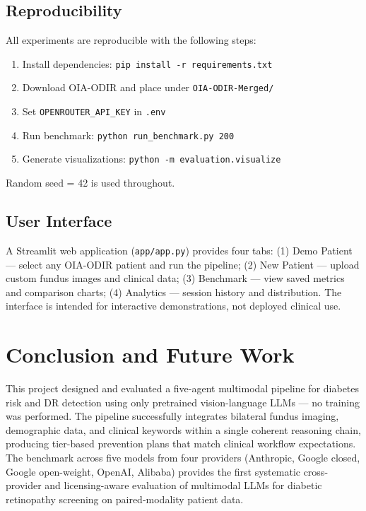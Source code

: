 \documentclass[11pt,a4paper]{article}
\begin{document}
\subsection{Reproducibility}

All experiments are reproducible with the following steps:

\begin{enumerate}
    \item Install dependencies: \texttt{pip install -r requirements.txt}
    \item Download OIA-ODIR and place under \texttt{OIA-ODIR-Merged/}
    \item Set \texttt{OPENROUTER\_API\_KEY} in \texttt{.env}
    \item Run benchmark: \texttt{python run\_benchmark.py 200}
    \item Generate visualizations: \texttt{python -m evaluation.visualize}
\end{enumerate}

Random seed = 42 is used throughout.

\subsection{User Interface}

A Streamlit web application (\texttt{app/app.py}) provides four tabs: (1) Demo Patient --- select any OIA-ODIR patient and run the pipeline; (2) New Patient --- upload custom fundus images and clinical data; (3) Benchmark --- view saved metrics and comparison charts; (4) Analytics --- session history and distribution. The interface is intended for interactive demonstrations, not deployed clinical use.

\section{Conclusion and Future Work}

This project designed and evaluated a five-agent multimodal pipeline for diabetes risk and DR detection using only pretrained vision-language LLMs --- no training was performed. The pipeline successfully integrates bilateral fundus imaging, demographic data, and clinical keywords within a single coherent reasoning chain, producing tier-based prevention plans that match clinical workflow expectations. The benchmark across five models from four providers (Anthropic, Google closed, Google open-weight, OpenAI, Alibaba) provides the first systematic cross-provider and licensing-aware evaluation of multimodal LLMs for diabetic retinopathy screening on paired-modality patient data.
\end{document}
